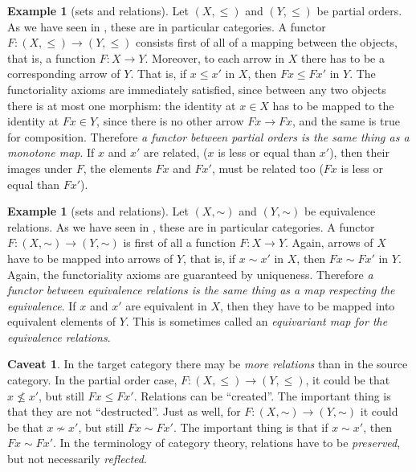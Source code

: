 \documentclass[12pt,oneside,headings=small]{scrbook}
\def\simord{\mathord\sim}
\numberwithin{equation}{section}
\theoremstyle{plain}
\theoremstyle{definition}
\newtheorem{eg}[thm]{Example}
\newtheorem*{caveat}{Caveat}
\DeclareMathOperator{\1}{\mathbbm{1}}
\DeclareMathOperator{\2}{\mathbbm{2}}
\begin{document}
\begin{eg}[sets and relations]
 Let $(X,\le)$ and $(Y,\le)$ be partial orders. As we have seen in , these are in particular categories. A functor $F:(X,\le)\to (Y,\le)$ consists first of all of a mapping between the objects, that is, a function $F:X\to Y$. Moreover, to each arrow in $X$ there has to be a corresponding arrow of $Y$. That is, if $x\le x'$ in $X$, then $Fx \le Fx'$ in $Y$. The functoriality axioms are immediately satisfied, since between any two objects there is at most one morphism: the identity at $x\in X$ has to be mapped to the identity at $Fx\in Y$, since there is no other arrow $Fx\to Fx$, and the same is true for composition. 
 Therefore \emph{a functor between partial orders is the same thing as a monotone map}. If $x$ and $x'$ are related, ($x$ is less or equal than $x'$), then their images under $F$, the elements $Fx$ and $Fx'$, must be related too ($Fx$ is less or equal than $Fx'$). 
\end{eg}

\begin{eg}[sets and relations]\label{equequ}
 Let $(X,\simord)$ and $(Y,\simord)$ be equivalence relations. As we have seen in , these are in particular categories. A functor $F:(X,\simord)\to(Y,\simord)$ is first of all a function $F:X\to Y$. Again, arrows of $X$ have to be mapped into arrows of $Y$, that is, if $x\sim x'$ in $X$, then $Fx \sim Fx'$ in $Y$. Again, the functoriality axioms are guaranteed by uniqueness.
 Therefore \emph{a functor between equivalence relations is the same thing as a map respecting the equivalence}.
 If $x$ and $x'$ are equivalent in $X$, then they have to be mapped into equivalent elements of $Y$. This is sometimes called an \emph{equivariant map for the equivalence relations}. 
\end{eg}

\begin{caveat}
 In the target category there may be \emph{more relations} than in the source category. In the partial order case, $F:(X,\le)\to (Y,\le)$, it could be that $x\nleq x'$, but still $Fx \leq Fx'$. Relations can be ``created''. The important thing is that they are not ``destructed''.
 Just as well, for $F:(X,\simord)\to(Y,\simord)$ it could be that $x\nsim x'$, but still $Fx \sim Fx'$. The important thing is that if $x\sim x'$, then $Fx \sim Fx'$.
 In the terminology of category theory, relations have to be \emph{preserved}, but not necessarily \emph{reflected}. 
\end{caveat}
\end{document}
